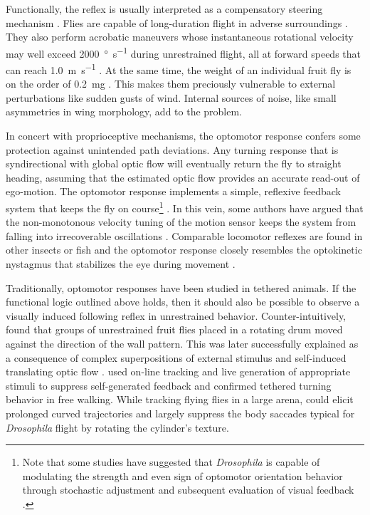 Functionally, the reflex is usually interpreted as a compensatory steering mechanism \citep{Gotz:1968aa,Heisenberg:1984aa}. Flies are capable of long-duration flight in adverse surroundings \citep{Goetz:1987aa,Dickinson:2014aa}. They also perform acrobatic maneuvers whose instantaneous rotational velocity may well exceed \SI{2000}{\degree\per\second} during unrestrained flight, all at forward speeds that can reach \SI{1.0}{\metre\per\second} \citep{Land:1974dp,Mronz:2008eb,Censi:2013cya}. At the same time, the weight of an individual fruit fly is on the order of \SI{0.2}{\milli\gram} \citep{Seiger:1966a}. This makes them preciously vulnerable to external perturbations like sudden gusts of wind. Internal sources of noise, like small asymmetries in wing morphology, add to the problem.

In concert with proprioceptive mechanisms, the optomotor response confers some protection against unintended path deviations. Any turning response that is syndirectional with global optic flow will eventually return the fly to straight heading, assuming that the estimated optic flow provides an accurate read-out of ego-motion. The optomotor response implements a simple, reflexive feedback system that keeps the fly on course\footnote{Note that some studies have suggested that \textit{Drosophila} is capable of modulating the strength and even sign of optomotor orientation behavior through stochastic adjustment and subsequent evaluation of visual feedback \citep{Wolf:1986ii,Wolf:1992aa}.} \citep{Borst:2014kl}. In this vein, some authors have argued that the non-monotonous velocity tuning of the motion sensor keeps the system from falling into irrecoverable oscillations \citep{Warzecha:1996bm}. Comparable locomotor reflexes are found in other insects or fish \citep{Arnold:1974aa,Portugues:2009aa} and the optomotor response closely resembles the optokinetic nystagmus that stabilizes the eye during movement \citep{Buttner:2007aa}.

Traditionally, optomotor responses have been studied in tethered animals. If the functional logic outlined above holds, then it should also be possible to observe a visually induced following reflex in unrestrained behavior. Counter-intuitively, \citet{Goetz:1970aa} found that groups of unrestrained fruit flies placed in a rotating drum moved against the direction of the wall pattern. This was later successfully explained as a consequence of complex superpositions of external stimulus and self-induced translating optic flow \citep{Goetz:1975aa}. \citet{Strauss:1997ut} used on-line tracking and live generation of appropriate stimuli to suppress self-generated feedback and confirmed tethered turning behavior in free walking. While tracking flying flies in a large arena, \citet{Mronz:2008eb} could elicit prolonged curved trajectories and largely suppress the body saccades typical for \textit{Drosophila} flight by rotating the cylinder's texture.


